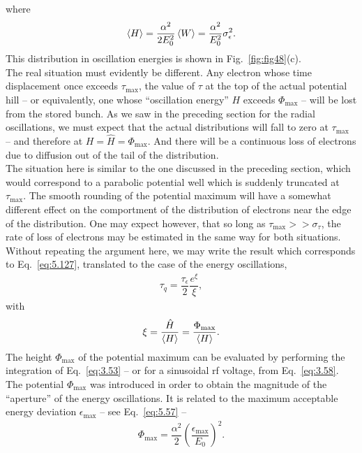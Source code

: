 where
\begin{align}
	\left< H \right> = \dfrac{\alpha^2}{2 E_0^2} \left< W \right> = \dfrac{\alpha^2}{E_0^2} \sigma_\epsilon^2.
\end{align}
This distribution in oscillation energies is shown in Fig.~\ref{fig:fig48}(c).\\
The real situation must evidently be different. Any electron whose time displacement once exceeds $\tau_\text{max}$, the value of $\tau$ at the top of the actual potential hill -- or equivalently, one whose ``oscillation energy'' $H$ exceeds $\Phi_\text{max}$ -- will be lost from the stored bunch. As we saw in the preceding section for the radial oscillations, we must expect that the actual distributions will fall to zero at $\tau_\text{max}$ -- and therefore at $H = \hat{H} = \Phi_\text{max}$. And there will be a continuous loss of electrons due to diffusion
 out of the tail of the distribution.\\
The situation here is similar to the one discussed in the preceding section, which would correspond to a parabolic potential well which is suddenly truncated at $\tau_\text{max}$. The smooth rounding of the potential maximum will have a somewhat different effect on the comportment of the distribution of electrons near the edge of the distribution. One may expect however, that so long as $\tau_\text{max} >> \sigma_\tau$, the rate of loss of electrons may be estimated in the same way for both situations.\\
Without repeating the argument here, we may write the result which corresponds to Eq.~\eqref{eq:5.127}, translated to the case of the energy oscillations,
\begin{align}
	\tau_q = \dfrac{\tau_\epsilon}{2} \dfrac{e^\xi}{\xi},
\end{align}
with
\begin{align}
	\xi = \dfrac{\hat{H}}{\left< H \right>} = \dfrac{\Phi_\text{max}}{\left< H \right>}.
\end{align}
The height $\Phi_\text{max}$ of the potential maximum can be evaluated by performing the integration of Eq.~\eqref{eq:3.53} -- or for a sinusoidal rf voltage, from Eq.~\eqref{eq:3.58}.\\
The potential $\Phi_\text{max}$ was introduced in order to obtain the magnitude of the ``aperture''
 of the energy oscillations. It is related to the maximum acceptable energy deviation $\epsilon_\text{max}$ -- see Eq.~\eqref{eq:5.57} --
\begin{align}
	\Phi_\text{max} = \dfrac{\alpha^2}{2} \left( \dfrac{\epsilon_\text{max}}{E_0} \right)^2.
\end{align}

